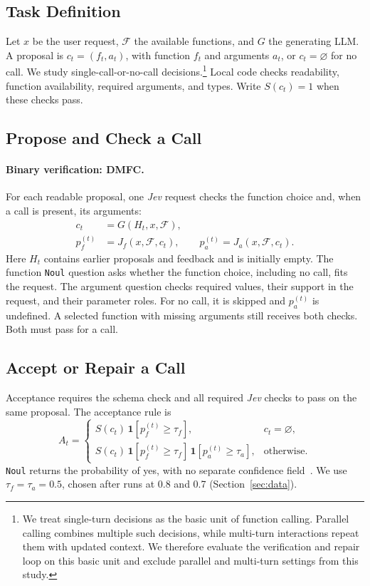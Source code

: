 \subsection{Task Definition}
Let $x$ be the user request, $\mathcal{F}$ the available functions, and $G$ the generating LLM. A proposal is $c_t=(f_t,a_t)$, with function $f_t$ and arguments $a_t$, or $c_t=\varnothing$ for no call. We study single-call-or-no-call decisions.\footnote{We treat single-turn decisions as the basic unit of function calling. Parallel calling combines multiple such decisions, while multi-turn interactions repeat them with updated context. We therefore evaluate the verification and repair loop on this basic unit and exclude parallel and multi-turn settings from this study.} Local code checks readability, function availability, required arguments, and types. Write $S(c_t)=1$ when these checks pass.

\subsection{Propose and Check a Call}
\paragraph{Binary verification: \textbf{DMFC}.}
For each readable proposal, one \textit{Jev} request checks the function choice and, when a call is present, its arguments:
\begin{align}
 c_t&=G(H_t,x,\mathcal{F}),\\
 p_f^{(t)}&=J_f(x,\mathcal{F},c_t),\qquad
 p_a^{(t)}=J_a(x,\mathcal{F},c_t).
\end{align}
Here $H_t$ contains earlier proposals and feedback and is initially empty. The function \texttt{Noul} question asks whether the function choice, including no call, fits the request. The argument question checks required values, their support in the request, and their parameter roles. For no call, it is skipped and $p_a^{(t)}$ is undefined. A selected function with missing arguments still receives both checks. Both must pass for a call.

\subsection{Accept or Repair a Call}
Acceptance requires the schema check and all required \textit{Jev} checks to pass on the same proposal. The acceptance rule is
\begin{equation}
 A_t=\begin{cases}
 S(c_t)\,\mathbf{1}[p_f^{(t)}\geq\tau_f], & c_t=\varnothing,\\
 S(c_t)\,\mathbf{1}[p_f^{(t)}\geq\tau_f]\,
 \mathbf{1}[p_a^{(t)}\geq\tau_a], & \text{otherwise}.
 \end{cases}
\label{eq:gate}
\end{equation}
\texttt{Noul} returns the probability of yes, with no separate confidence field~\cite{typesafe2026noul,typesafe2026confidence}. We use $\tau_f=\tau_a=0.5$, chosen after runs at 0.8 and 0.7 (Section~\ref{sec:data}).

